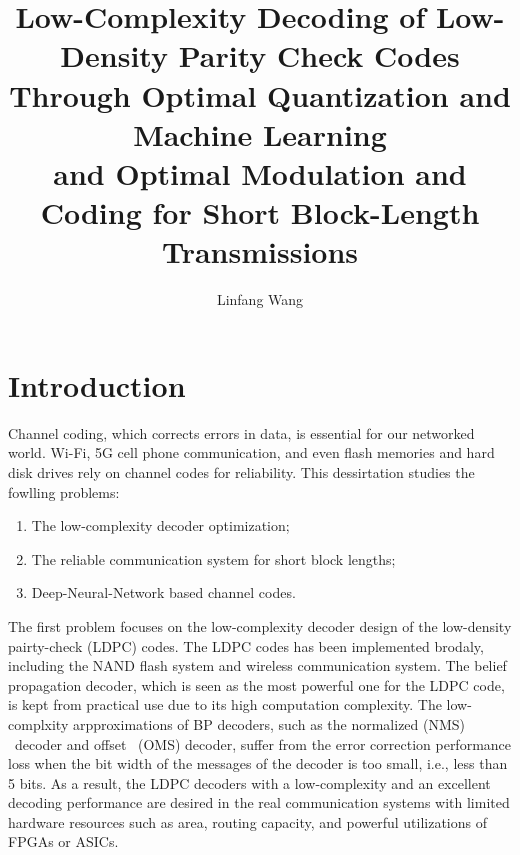 \documentclass [PhD] {uclathes}
\title          {Low-Complexity Decoding of Low-Density Parity Check Codes \\
                Through Optimal Quantization and Machine Learning \\
                and Optimal Modulation and Coding for Short Block-Length Transmissions}
\author         {Linfang Wang}
\begin{document}
\makeintropages

%
%

\chapter{Introduction}

Channel coding, which corrects errors in data, is essential for our networked world. Wi-Fi, 5G cell phone communication, and even flash memories and hard disk drives rely on channel codes for reliability. This dessirtation studies the fowlling problems: 
\begin{enumerate}
    \item The low-complexity decoder optimization;
    \item The reliable communication system for short block lengths;
    \item Deep-Neural-Network based channel codes.
\end{enumerate}

The first problem focuses on the low-complexity decoder design of the low-density pairty-check (LDPC) codes\cite{gallager1962low}. The LDPC codes has been implemented brodaly, including the NAND flash system and wireless communication system. The belief propagation decoder, which is seen as the most powerful one for the LDPC code, is kept from practical use due to its high computation complexity. The low-complxity arpproximations of BP  decoders, such as the normalized \minsum (NMS) ~decoder and offset \minsum~(OMS) decoder, suffer from the error correction performance loss when the bit width of the messages of the decoder is too small, i.e., less than 5 bits. As a result, the LDPC decoders with a low-complexity and an excellent decoding performance are desired in the real communication systems with limited hardware resources such as area, routing capacity, and powerful utilizations of FPGAs or ASICs. 
\end{document}
